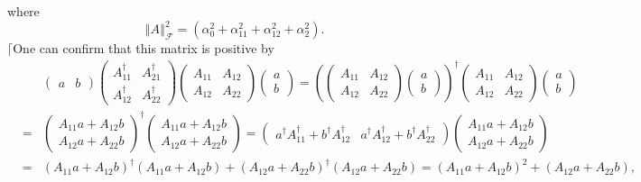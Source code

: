 \documentclass[aps,preprint]{revtex4}
\begin{document}
where 
\begin{equation}
\left\Vert A\right\Vert _{\mathcal{F}}^{2}=\left( \alpha _{0}^{2}+\alpha
_{11}^{2}+\alpha _{12}^{2}+\alpha _{2}^{2}\right) .
\end{equation}%
$\lceil $One can confirm that this matrix is positive by%
\begin{eqnarray}
&&\left( 
\begin{array}{cc}
a & b%
\end{array}%
\right) \left( 
\begin{array}{cc}
A_{11}^{\dagger } & A_{21}^{\dagger } \\ 
A_{12}^{\dagger } & A_{22}^{\dagger }%
\end{array}%
\right) \left( 
\begin{array}{cc}
A_{11} & A_{12} \\ 
A_{12} & A_{22}%
\end{array}%
\right) \left( 
\begin{array}{c}
a \\ 
b%
\end{array}%
\right) =\left( \left( 
\begin{array}{cc}
A_{11} & A_{12} \\ 
A_{12} & A_{22}%
\end{array}%
\right) \left( 
\begin{array}{c}
a \\ 
b%
\end{array}%
\right) \right) ^{\dagger }\left( 
\begin{array}{cc}
A_{11} & A_{12} \\ 
A_{12} & A_{22}%
\end{array}%
\right) \left( 
\begin{array}{c}
a \\ 
b%
\end{array}%
\right) \\
&=&\left( 
\begin{array}{c}
A_{11}a+A_{12}b \\ 
A_{12}a+A_{22}b%
\end{array}%
\right) ^{\dagger }\left( 
\begin{array}{c}
A_{11}a+A_{12}b \\ 
A_{12}a+A_{22}b%
\end{array}%
\right) =\left( 
\begin{array}{cc}
a^{\dagger }A_{11}^{\dagger }+b^{\dagger }A_{12}^{\dagger } & a^{\dagger
}A_{12}^{\dagger }+b^{\dagger }A_{22}^{\dagger }%
\end{array}%
\right) \left( 
\begin{array}{c}
A_{11}a+A_{12}b \\ 
A_{12}a+A_{22}b%
\end{array}%
\right) \\
&=&\left( A_{11}a+A_{12}b\right) ^{\dagger }\left( A_{11}a+A_{12}b\right)
+\left( A_{12}a+A_{22}b\right) ^{\dagger }\left( A_{12}a+A_{22}b\right)
=\left( A_{11}a+A_{12}b\right) ^{2}+\left( A_{12}a+A_{22}b\right) ,
\end{eqnarray}%
\end{document}
